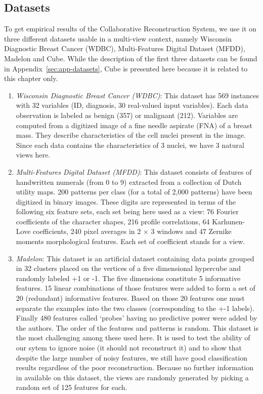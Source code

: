 	\subsection{Datasets}
\label{sec:datasets}
To get empirical results of the Collaborative Reconstruction System, we use it on three different datasets usable in a multi-view context, namely Wisconsin Diagnostic Breast Cancer (WDBC), Multi-Features Digital Dataset (MFDD), Madelon and Cube. While the description of the first three datasets can be found in Appendix~\ref{sec:app-datasets}, Cube is presented here because it is related to this chapter only.
	\begin{enumerate}
        \item \textit{Wisconsin Diagnostic Breast Cancer (WDBC)}: This dataset has 569 instances with 32  variables (ID, diagnosis, 30 real-valued input variables). Each data observation is labeled as benign (357) or malignant (212). Variables are computed from a digitized image of a fine needle aspirate (FNA) of a breast mass.  They describe characteristics of the cell nuclei present in the image. Since each data contains the characteristics of 3 nuclei, we have 3 natural views here.
        \item \textit{Multi-Features Digital Dataset (MFDD)}: This dataset consists of features of handwritten numerals (from 0 to 9) extracted from a collection of Dutch utility maps. 200 patterns per class (for a total of 2,000 patterns) have been digitized in binary images. These digits are represented in terms of the following six feature sets, each set being here used as a view: 76 Fourier coefficients of the character shapes, 216 profile correlations, 64 Karhunen-Love coefficients, 240 pixel averages in 2 $\times$ 3 windows and 47 Zernike moments morphological features. Each set of coefficient stands for a view.
        \item \textit{Madelon}: This dataset is an artificial dataset containing data points grouped in 32 clusters placed on the vertices of a five dimensional hypercube and randomly labeled +1 or -1. The five dimensions constitute 5 informative features. 15 linear combinations of those features were added to form a set of 20 (redundant) informative features. Based on those 20 features one must separate the examples into the two classes (corresponding to the +-1 labels). Finally 480 features called `probes' having no predictive power were added by the authors. The order of the features and patterns is random. This dataset is the most challenging among these used here. It is used to test the ability of our sytem to ignore noise (it should not reconstruct it) and to show that despite the large number of noisy features, we still have good classification results regardless of the poor reconstruction. Because no further information in available on this dataset, the views are randomly generated by picking a random set of 125 features for each.

\end{enumerate}
